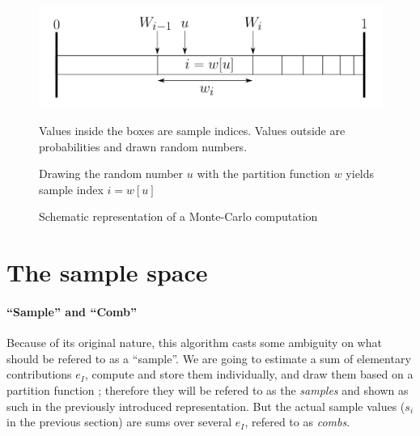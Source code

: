\documentclass[./thesis.tex]{subfiles}
\begin{document}
\begin{figure}[h!]
	\begin{center}
		\includegraphics[width=0.9\columnwidth]{figures/pt2/mc_representation}
		\caption{Schematic representation of a Monte-Carlo computation}
		\label{fig:mc_representation}
Values inside the boxes are sample indices. Values outside are probabilities and drawn random numbers.

Drawing the random number $u$ with the partition function $w$ yields sample index $i=w[u]$
	\end{center}
\end{figure}




\section{The sample space}

\paragraph{``Sample'' and ``Comb''}
Because of its original nature, this algorithm casts some ambiguity on what should be refered to as a ``sample''. We are going to estimate a sum of elementary contributions $e_I$, compute and store them individually, and draw them based on a partition function ; therefore they will be refered to as the \emph{samples} and shown as such in the previously introduced representation. But the actual sample values ($s_i$ in the previous section) are sums over several $e_I$, refered to as \emph{combs}.
\end{document}
